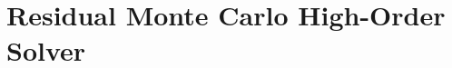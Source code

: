 \documentclass[xcolor=dvipsnames,hyperref={pdfpagelabels=false},unknownkeysallowed]{beamer}
\newcommand{\colb}[1]{{\color{blue} #1}}
\newcommand{\colG}[1]{{\color{Gray!110} #1}}
\newcommand{\colr}[1]{{\color{red} #1}}
\newlength{\tabsep}
\begin{document}



\section{Residual Monte Carlo High-Order Solver}
\subsection{}
\end{document}
